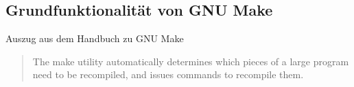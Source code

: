 \subsection{Grundfunktionalität von GNU Make}
\begin{frame}
Auszug aus dem Handbuch zu GNU Make
\begin{quote}
The make utility automatically determines which pieces of a large program need to be recompiled, and issues commands to recompile them.
\end{quote}
\end{frame}
